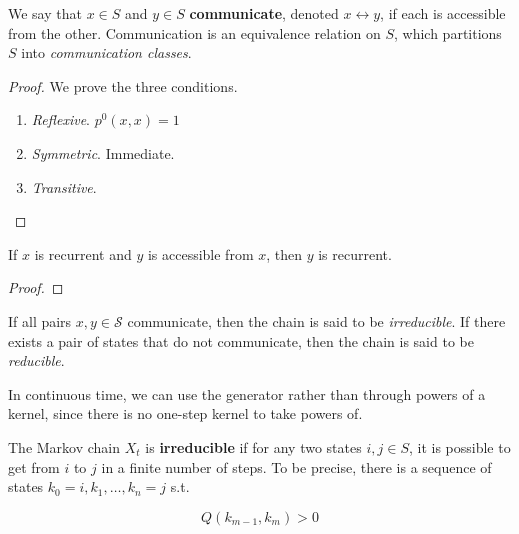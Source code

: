 	\begin{definition}[Communication]
		\label{def:communication}
		We say that $x \in S$ and $y \in S$ \textbf{communicate}, denoted $x \leftrightarrow y$, if each is accessible from the other. Communication is an equivalence relation on $S$, which partitions $S$ into \textit{communication classes}. 
	\end{definition}
	\begin{proof}
		We prove the three conditions. 
		\begin{enumerate}
		  \item \textit{Reflexive}. $p^0(x,x) = 1$
			\item \textit{Symmetric}. Immediate. 
			\item \textit{Transitive}. 
		\end{enumerate}
	\end{proof}

	\begin{lemma}
		\label{thm:recurrence-is-a-class-property}
		If $x$ is recurrent and $y$ is accessible from $x$, then $y$ is recurrent. 
	\end{lemma}
	\begin{proof}
	  
	\end{proof}

  \begin{definition}
    \label{def:irreducible-chains}
    If all pairs $x, y \in \mathcal{S}$ communicate, then the chain is said to be \textit{irreducible}. If there exists a pair of states that do not communicate, then the chain is said to be \textit{reducible}. 
  \end{definition}

	In continuous time, we can use the generator rather than through powers of a kernel, since there is no one-step kernel to take powers of.

	\begin{example}
		\label{def:irreducibility}
		The Markov chain $X_t$ is \textbf{irreducible} if for any two states $i, j \in S$, it is possible to get from $i$ to $j$ in a finite number of steps. To be precise, there is a sequence of states $k_0 = i, k_1, \ldots, k_n = j$ s.t. 

			\begin{equation}
				Q(k_{m-1}, k_m) > 0
			\end{equation}
	\end{example}

